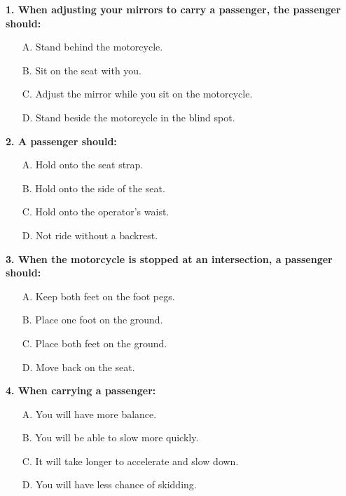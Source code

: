 \begin{minipage}{\linewidth}
\vspace{1em}\noindent\textbf{1. When adjusting your mirrors to carry a passenger, the passenger should:}

\begin{itemize}[nosep,leftmargin=2em]
\item [A.] Stand behind the motorcycle.
\item [B.] Sit on the seat with you.
\item [C.] Adjust the mirror while you sit on the motorcycle.
\item [D.] Stand beside the motorcycle in the blind spot.

\end{itemize}
\end{minipage}


\begin{minipage}{\linewidth}
\vspace{1em}\noindent\textbf{2. A passenger should:}

\begin{itemize}[nosep,leftmargin=2em]
\item [A.] Hold onto the seat strap.
\item [B.] Hold onto the side of the seat.
\item [C.] Hold onto the operator's waist.
\item [D.] Not ride without a backrest.

\end{itemize}
\end{minipage}


\begin{minipage}{\linewidth}
\vspace{1em}\noindent\textbf{3. When the motorcycle is stopped at an intersection, a passenger should:}

\begin{itemize}[nosep,leftmargin=2em]
\item [A.] Keep both feet on the foot pegs.
\item [B.] Place one foot on the ground.
\item [C.] Place both feet on the ground.
\item [D.] Move back on the seat.

\end{itemize}
\end{minipage}


\begin{minipage}{\linewidth}
\vspace{1em}\noindent\textbf{4. When carrying a passenger:}

\begin{itemize}[nosep,leftmargin=2em]
\item [A.] You will have more balance.
\item [B.] You will be able to slow more quickly.
\item [C.] It will take longer to accelerate and slow down.
\item [D.] You will have less chance of skidding.

\end{itemize}
\end{minipage}


